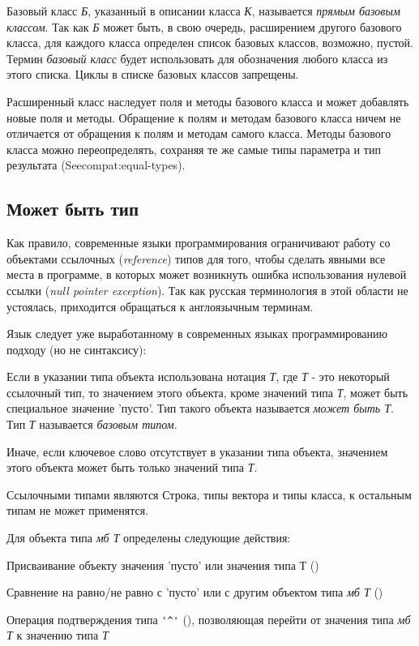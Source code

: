 Базовый класс \emph{Б}, указанный в описании класса \emph{К}, называется \emph{прямым базовым классом}. 
Так как \emph{Б} может быть, в свою очередь, расширением другого базового класса, для каждого класса определен список базовых классов, возможно, пустой.
Термин \emph{базовый класс} будет использовать для обозначения любого класса из этого списка. Циклы в списке базовых классов запрещены.

Расширенный класс наследует поля и методы базового класса и может добавлять новые поля и методы.
Обращение к полям и методам базового класса ничем не отличается от обращения к полям и методам самого класса. 
Методы базового класса можно переопределять, сохраняя те же самые типы параметра и тип результата (See{compat:equal-types}).

\hypertarget{mb-types}{%
\subsection{Может быть тип}\label{decls:mb-types}}

Как правило, современные языки программирования ограничивают работу со объектами ссылочных (\emph{reference}) типов для того, 
чтобы сделать явными все места в программе, в которых может возникнуть ошибка использования нулевой ссылки (\emph{null pointer exception}). 
Так как русская терминология в этой области не устоялась, приходится обращаться к англоязычным терминам.

Язык \thelang{} следует уже выработанному в современных языках программированию подходу (но не синтаксису):
\begin{d_itemize}
\item
    Если в указании типа объекта использована нотация \emph{ Т}, где \emph{Т} - это некоторый ссылочный тип,  
    то значением этого объекта, кроме значений типа \emph{Т}, может быть специальное значение 'пусто'. Тип такого объекта называется \emph{может быть Т}. Тип \emph{Т} называется \emph{базовым типом}.
\item
    Иначе, если ключевое слово  отсутствует в указании типа объекта, значением этого объекта может быть только значений типа \emph{Т}.
\end{d_itemize}

Ссылочными типами являются Строка, типы вектора и типы класса, к остальным типам  не может применятся.

Для объекта типа \emph{мб Т} определены следующие действия:
\begin{d_itemize}
\item
    Присваивание объекту значения 'пусто' или значения типа Т ()
\item
    Сравнение на равно/не равно с 'пусто'  или с другим объектом типа \emph{мб Т} ()
\item
    Операция подтверждения типа \verb+'^'+ (), позволяющая перейти от значения типа \emph{мб Т} к значению типа \emph{Т}
\end{d_itemize}

